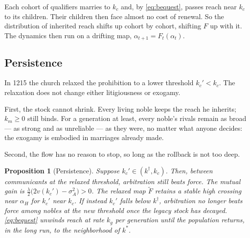 \documentclass[12pt]{article}
\newtheorem{proposition}{Proposition}
\theoremstyle{definition}
\theoremstyle{remark}
\begin{document}
Each cohort of qualifiers marries to $k_c$ and, by \eqref{eq:bequest}, passes reach near $k_c$ to its children. Their children then face almost no cost of renewal. So the distribution of inherited reach shifts up cohort by cohort, shifting $F$ up with it. The dynamics then run on a drifting map, $\alpha_{t+1}=F_t(\alpha_t)$.

\subsection{Persistence}

In 1215 the church relaxed the prohibition to a lower threshold $k_c'<k_c$. The relaxation does not change either litigiousness or exogamy.

First, the stock cannot shrink. Every living noble keeps the reach he inherits; $k_m\ge 0$ still binds. For a generation at least, every noble's rivals remain as broad --- as strong and as unreliable --- as they were, no matter what anyone decides: the exogamy is embodied in marriages already made.

Second, the flow has no reason to stop, so long as the rollback is not too deep.

\begin{proposition}[Persistence]\label{p:persist}
Suppose $k_c'\in(k^\dagger,k_c)$. Then, between communicants at the relaxed threshold, arbitration still beats force. The mutual gain is $\tfrac{\lambda}{2}\bigl(2v(k_c')-\sigma^2_A\bigr)>0$. The relaxed map $\tilde F$ retains a stable high crossing near $\alpha_H$ for $k_c'$ near $k_c$. If instead $k_c'$ falls below $k^\dagger$, arbitration no longer beats force among nobles at the new threshold once the legacy stock has decayed. \eqref{eq:bequest} unwinds reach at rate $k_g$ per generation until the population returns, in the long run, to the neighborhood of $k^\ast$.
\end{proposition}
\end{document}
